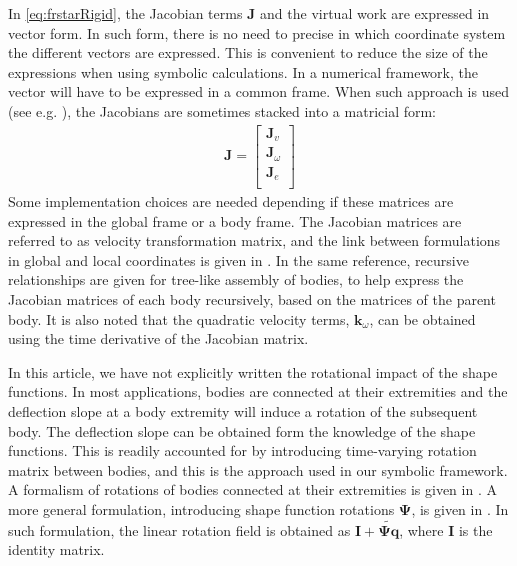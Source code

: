 \documentclass[wes, manuscript]{copernicus}
\renewcommand{\v}[1]{\boldsymbol{#1}}
\newcommand{\m}[1]{\boldsymbol{#1}}
\begin{document}
In \autoref{eq:frstarRigid}, the Jacobian terms $\v{J}$ and the virtual work are expressed in vector form. In such form, there is no need to precise in which coordinate system the different vectors are expressed. This is convenient to reduce the size of the expressions when using symbolic calculations. In a numerical framework, the vector will have to be expressed in a common frame. When such approach is used (see e.g. \cite{Lemmer:2018, branlard:2019flex}), the Jacobians are sometimes stacked into a matricial form:
\begin{align}
\m{J} = 
    \begin{bmatrix}
    \v{J}_v \\
    \v{J}_\omega\\
    \v{J}_e \\
    \end{bmatrix}
\end{align}
Some implementation choices are needed depending if these matrices are expressed in the global frame or a body frame. The Jacobian matrices are referred to as velocity transformation matrix, and the link between formulations in global and local coordinates is given in \cite{branlard:2019flex}. In the same reference, recursive relationships are given for tree-like assembly of bodies, to help express the Jacobian matrices of each body recursively, based on the matrices of the parent body. It is also noted that the quadratic velocity terms, $\v{k}_\omega$, can be obtained using the time derivative of the Jacobian matrix.

In this article, we have not explicitly written the rotational impact of the shape functions. In most applications, bodies are connected at their extremities and the deflection slope at a body extremity will induce a rotation of the subsequent body. The deflection slope can be obtained form the knowledge of the shape functions. This is readily accounted for by introducing time-varying rotation matrix between bodies, and this is the approach used in our symbolic framework. A formalism of rotations of bodies connected at their extremities is given in \cite{branlard:2019flex}. A more general formulation, introducing shape function rotations $\m{\Psi}$, is given in \citep{Wallrapp:1994, Schwertassek:book, Lemmer:2018}. In such formulation, the linear rotation field is obtained as $\m{I}+\m{\widetilde{\m{\Psi}\v{q}}}$, where $\m{I}$ is the identity matrix.
\end{document}
